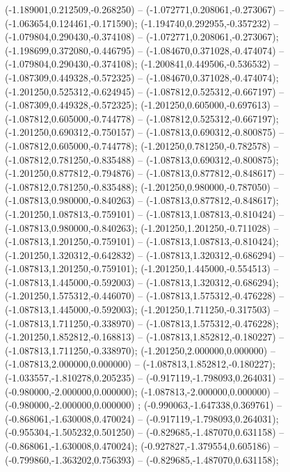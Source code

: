  (-1.189001,0.212509,-0.268250) -- (-1.072771,0.208061,-0.273067) -- (-1.063654,0.124461,-0.171590);
 (-1.194740,0.292955,-0.357232) -- (-1.079804,0.290430,-0.374108) -- (-1.072771,0.208061,-0.273067);
 (-1.198699,0.372080,-0.446795) -- (-1.084670,0.371028,-0.474074) -- (-1.079804,0.290430,-0.374108);
 (-1.200841,0.449506,-0.536532) -- (-1.087309,0.449328,-0.572325) -- (-1.084670,0.371028,-0.474074);
 (-1.201250,0.525312,-0.624945) -- (-1.087812,0.525312,-0.667197) -- (-1.087309,0.449328,-0.572325);
 (-1.201250,0.605000,-0.697613) -- (-1.087812,0.605000,-0.744778) -- (-1.087812,0.525312,-0.667197);
 (-1.201250,0.690312,-0.750157) -- (-1.087813,0.690312,-0.800875) -- (-1.087812,0.605000,-0.744778);
 (-1.201250,0.781250,-0.782578) -- (-1.087812,0.781250,-0.835488) -- (-1.087813,0.690312,-0.800875);
 (-1.201250,0.877812,-0.794876) -- (-1.087813,0.877812,-0.848617) -- (-1.087812,0.781250,-0.835488);
 (-1.201250,0.980000,-0.787050) -- (-1.087813,0.980000,-0.840263) -- (-1.087813,0.877812,-0.848617);
 (-1.201250,1.087813,-0.759101) -- (-1.087813,1.087813,-0.810424) -- (-1.087813,0.980000,-0.840263);
 (-1.201250,1.201250,-0.711028) -- (-1.087813,1.201250,-0.759101) -- (-1.087813,1.087813,-0.810424);
 (-1.201250,1.320312,-0.642832) -- (-1.087813,1.320312,-0.686294) -- (-1.087813,1.201250,-0.759101);
 (-1.201250,1.445000,-0.554513) -- (-1.087813,1.445000,-0.592003) -- (-1.087813,1.320312,-0.686294);
 (-1.201250,1.575312,-0.446070) -- (-1.087813,1.575312,-0.476228) -- (-1.087813,1.445000,-0.592003);
 (-1.201250,1.711250,-0.317503) -- (-1.087813,1.711250,-0.338970) -- (-1.087813,1.575312,-0.476228);
 (-1.201250,1.852812,-0.168813) -- (-1.087813,1.852812,-0.180227) -- (-1.087813,1.711250,-0.338970);
 (-1.201250,2.000000,0.000000) -- (-1.087813,2.000000,0.000000) -- (-1.087813,1.852812,-0.180227);
 (-1.033557,-1.810278,0.205235) -- (-0.917119,-1.798093,0.264031) -- (-0.980000,-2.000000,0.000000);
 (-1.087813,-2.000000,0.000000) -- (-0.980000,-2.000000,0.000000) ;
 (-0.990063,-1.647338,0.369761) -- (-0.868061,-1.630008,0.470024) -- (-0.917119,-1.798093,0.264031);
 (-0.955304,-1.505232,0.501250) -- (-0.829685,-1.487070,0.631158) -- (-0.868061,-1.630008,0.470024);
 (-0.927827,-1.379554,0.605186) -- (-0.799860,-1.363202,0.756393) -- (-0.829685,-1.487070,0.631158);
